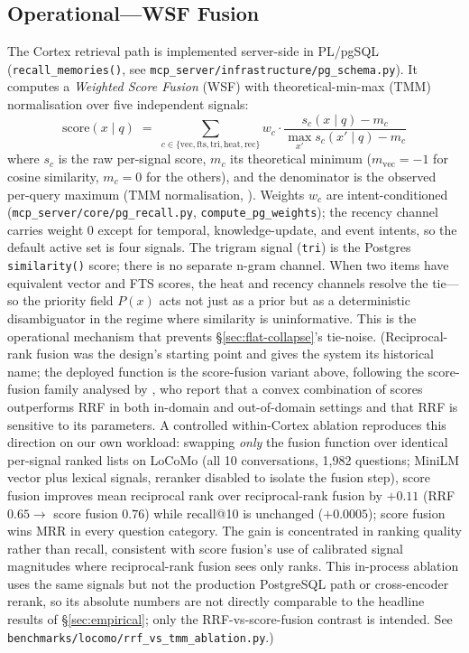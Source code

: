 \documentclass[11pt]{article}
\begin{document}
\subsection{Operational---WSF Fusion}
\label{sec:wrrf}

The Cortex retrieval path is implemented server-side in PL/pgSQL
(\texttt{recall\_memories()}, see
\texttt{mcp\_server/infrastructure/pg\_schema.py}).  It computes a
\emph{Weighted Score Fusion} (WSF) with theoretical-min-max (TMM)
normalisation \citep{Bruch2023} over five independent signals:
\begin{equation}
\mathrm{score}(x \mid q) \;=\;
\sum_{c \in \{\mathrm{vec}, \mathrm{fts}, \mathrm{tri}, \mathrm{heat}, \mathrm{rec}\}}
w_c \cdot
\frac{s_c(x \mid q) - m_c}{\max_{x'} s_c(x' \mid q) - m_c}
\label{eq:wrrf}
\end{equation}
where $s_c$ is the raw per-signal score, $m_c$ its theoretical
minimum ($m_{\mathrm{vec}} = -1$ for cosine similarity, $m_c = 0$ for
the others), and the denominator is the observed per-query maximum
(TMM normalisation, \citealt{Bruch2023}).  Weights $w_c$ are
intent-conditioned (\texttt{mcp\_server/core/pg\_recall.py},
\texttt{compute\_pg\_weights}); the recency channel carries weight
$0$ except for temporal, knowledge-update, and event intents, so the
default active set is four signals.  The trigram signal (\texttt{tri})
is the Postgres \texttt{similarity()} score; there is no separate
n-gram channel.  When two items have equivalent vector and FTS
scores, the heat and recency channels resolve the tie---so the
priority field $P(x)$ acts not just as a prior but as a deterministic
disambiguator in the regime where similarity is uninformative.  This
is the operational mechanism that prevents
\S\ref{sec:flat-collapse}'s tie-noise.  (Reciprocal-rank fusion
\citep{Cormack2009} was the design's starting point and gives the
system its historical name; the deployed function is the score-fusion
variant above, following the score-fusion family analysed by
\citet{Bruch2023}, who report that a convex combination of scores
outperforms RRF in both in-domain and out-of-domain settings and that
RRF is sensitive to its parameters. A controlled within-Cortex
ablation reproduces this direction on our own workload: swapping
\emph{only} the fusion function over identical
per-signal ranked lists on LoCoMo (all 10 conversations, 1{,}982
questions; MiniLM vector plus lexical signals, reranker disabled to
isolate the fusion step), score fusion improves mean reciprocal rank
over reciprocal-rank fusion by ${+}0.11$ (RRF $0.65 \to$ score fusion
$0.76$) while recall@10 is unchanged (${+}0.0005$); score fusion wins
MRR in every question category. The gain is concentrated in ranking
quality rather than recall, consistent with score fusion's use of
calibrated signal magnitudes where reciprocal-rank fusion sees only
ranks. This in-process ablation uses the same signals but not the
production PostgreSQL path or cross-encoder rerank, so its absolute
numbers are not directly comparable to the headline results of
\S\ref{sec:empirical}; only the RRF-vs-score-fusion contrast is
intended. See \texttt{benchmarks/locomo/rrf\_vs\_tmm\_ablation.py}.)
\end{document}
